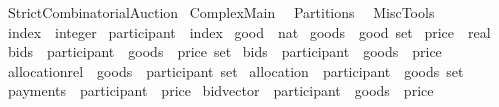 %
\begin{isabellebody}%
\def\isabellecontext{StrictCombinatorialAuction}%
%
\isamarkuptrue%
%
\isadelimtheory
%
\endisadelimtheory
%
\isatagtheory
{}\isamarkupfalse%
\ StrictCombinatorialAuction\isanewline
{}\ Complex{\isacharunderscore}Main\isanewline
\ \ Partitions\isanewline
\ \ MiscTools\isanewline
\isanewline
{}%
\endisatagtheory
{\isafoldtheory}%
%
\isadelimtheory
%
\endisadelimtheory
%
\isamarkuptrue%
\isamarkupfalse%
\ index\ {\isacharequal}\ {\isachardoublequoteopen}integer{\isachardoublequoteclose}\isanewline
{}\isamarkupfalse%
\ participant\ {\isacharequal}\ index\isanewline
{}\isamarkupfalse%
\ good\ {\isacharequal}\ nat\isanewline
{}\isamarkupfalse%
\ goods\ {\isacharequal}\ {\isachardoublequoteopen}good\ set{\isachardoublequoteclose}\isanewline
{}\isamarkupfalse%
\ price\ {\isacharequal}\ real\isanewline
{}\isamarkupfalse%
\ bids{}\ {\isacharequal}\ {\isachardoublequoteopen}{\isacharparenleft}{\isacharparenleft}participant\ {\isasymtimes}\ goods{\isacharparenright}\ {\isasymtimes}\ price{\isacharparenright}\ set{\isachardoublequoteclose}\isanewline
{}\isamarkupfalse%
\ bids\ {\isacharequal}\ {\isachardoublequoteopen}participant\ {\isasymRightarrow}\ goods\ {\isasymRightarrow}\ price{\isachardoublequoteclose}\isanewline
{}\isamarkupfalse%
\ allocation{\isacharunderscore}rel\ {\isacharequal}\ {\isachardoublequoteopen}{\isacharparenleft}goods\ {\isasymtimes}\ participant{\isacharparenright}\ set{\isachardoublequoteclose}\isanewline
{}\isamarkupfalse%
\ allocation\ {\isacharequal}\ {\isachardoublequoteopen}{\isacharparenleft}participant\ {\isasymtimes}\ goods{\isacharparenright}\ set{\isachardoublequoteclose}\ \isanewline
{}\isamarkupfalse%
\ payments\ {\isacharequal}\ {\isachardoublequoteopen}participant\ {\isasymRightarrow}\ price{\isachardoublequoteclose}\isanewline
{}\isamarkupfalse%
\ bidvector\ {\isacharequal}\ {\isachardoublequoteopen}{\isacharparenleft}participant\ {\isasymtimes}\ goods{\isacharparenright}\ {\isasymRightarrow}\ price{\isachardoublequoteclose}\isanewline

\end{isabellebody}
